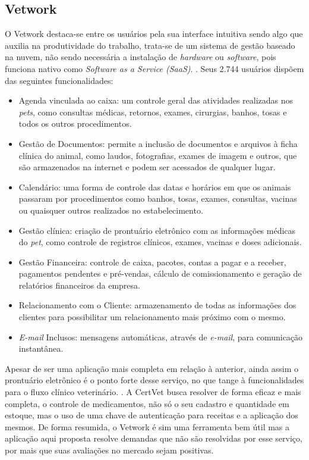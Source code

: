 \documentclass[
    12pt,               %
    openright,          %
    oneside,
    a4paper,            %
    BIBLATEX,           %
    TODO,               %
    english,            %
    brazil              %
    ]{ifsp-spo-inf-ctds}
\begin{document}
        \subsection{Vetwork}
        O Vetwork destaca-se entre os usuários pela sua interface intuitiva sendo algo que auxilia na produtividade do trabalho, trata-se de um sistema de gestão baseado na nuvem, não sendo necessária a instalação de \emph{hardware} ou \emph{software}, pois funciona nativo como \emph{Software as a Service (SaaS)}. . Seus 2.744 usuários dispõem das seguintes funcionalidades:

\begin{itemize}
    \item Agenda vinculada ao caixa: um controle geral das atividades realizadas nos \emph{pets}, como consultas médicas, retornos, exames, cirurgias, banhos, tosas e todos os outros procedimentos.
    \item Gestão de Documentos: permite a inclusão de documentos e arquivos à ficha clínica do animal, como laudos, fotografias, exames de imagem e outros, que são armazenados na internet e podem ser acessados de qualquer lugar.
    \item Calendário: uma forma de controle das datas e horários em que os animais passaram por procedimentos como banhos, tosas, exames, consultas, vacinas ou quaisquer outros realizados no estabelecimento.
    \item Gestão clínica: criação de prontuário eletrônico com as informações médicas do \emph{pet}, como controle de registros clínicos, exames, vacinas e doses adicionais.
    \item Gestão Financeira: controle de caixa, pacotes, contas a pagar e a receber, pagamentos pendentes e pré-vendas, cálculo de comissionamento e geração de relatórios financeiros da empresa.
    \item Relacionamento com o Cliente: armazenamento de todas as informações dos clientes para possibilitar um relacionamento mais próximo com o mesmo.
    \item \emph{E-mail} Inclusos: mensagens automáticas, através de \emph{e-mail}, para comunicação instantânea.
\end{itemize}

    Apesar de ser uma aplicação mais completa em relação à anterior, ainda assim o prontuário eletrônico é o ponto forte desse serviço, no que tange à funcionalidades para o fluxo clínico veterinário.  . A CertVet busca resolver de forma eficaz e mais completa, o controle de medicamentos, não só o seu cadastro e quantidade em estoque, mas o uso de uma chave de autenticação para receitas e a aplicação dos mesmos. De forma resumida, o Vetwork é sim uma ferramenta bem útil mas a aplicação aqui proposta resolve demandas que não são resolvidas por esse serviço, por mais que suas avaliações no mercado sejam positivas.
\end{document}
